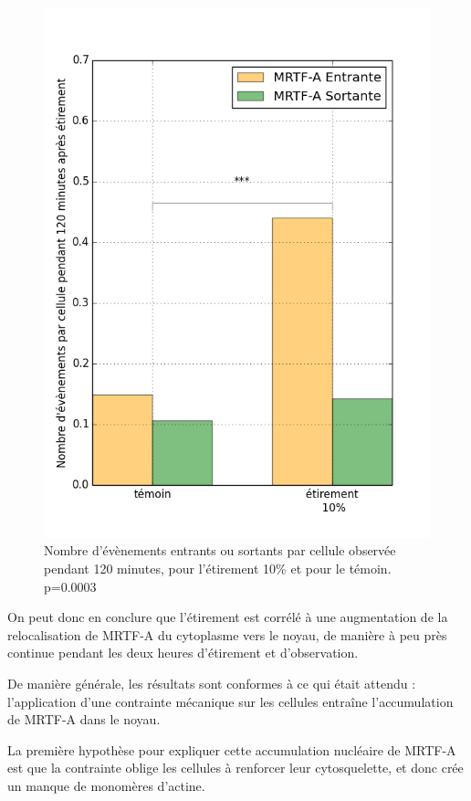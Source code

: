 \begin{figure}
\includegraphics[scale=0.4]{Figures/Etirement10_vs_temoin_activite.png} 
\caption{\label{activite_Et10} Nombre d'évènements entrants ou sortants par cellule observée pendant 120 minutes, pour l'étirement 10\% et pour le témoin. p=0.0003 }
\end{figure}

On peut donc en conclure que l'étirement est corrélé à une augmentation de la relocalisation de MRTF-A du cytoplasme vers le noyau, de manière à peu près continue pendant les deux heures d'étirement et d'observation. 

De manière générale, les résultats sont conformes à ce qui était attendu : l'application d'une contrainte mécanique sur les cellules entraîne l'accumulation de MRTF-A dans le noyau. 

La première hypothèse pour expliquer cette accumulation nucléaire de MRTF-A est que la contrainte oblige les cellules à renforcer leur cytosquelette, et donc crée un manque de monomères d'actine.  

